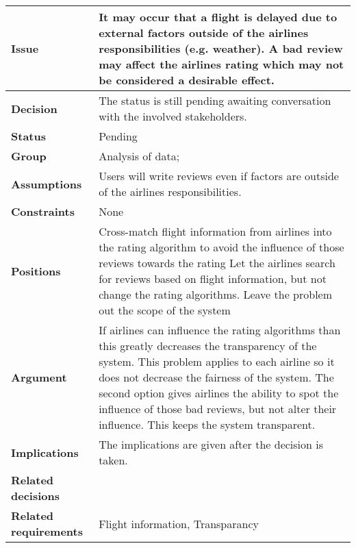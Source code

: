 
\begin{tabular}{ l  p{10cm}}
\hline
\bf Issue & It may occur that a flight is delayed due to external factors outside of the airlines responsibilities (e.g. weather). A bad review may affect the airlines rating which may not be considered a desirable effect.\\
\hline
\bf Decision & The status is still pending awaiting conversation with the involved stakeholders.\\
\hline
\bf Status & Pending\\
\hline
\bf Group & Analysis of data; \\
\hline
\bf Assumptions & Users will write reviews even if factors are outside of the airlines responsibilities.\\
\hline
\bf Constraints & None \\
\hline
\bf Positions & Cross-match flight information from airlines into the rating algorithm to avoid the influence of those reviews towards the rating \newline\newline
Let the airlines search for reviews based on flight information, but not change the rating algorithms. \newline\newline
Leave the problem out the scope of the system 
\\
\hline
\bf Argument & If airlines can influence the rating algorithms than this greatly decreases the transparency of the system. This problem applies to each airline so it does not decrease the fairness of the system. The second option gives airlines the ability to spot the influence of those bad reviews, but not alter their influence. This keeps the system transparent. \\
\hline
\bf Implications &The implications are given after the decision is taken.  \\
\hline
\bf Related decisions & \\
\hline
\bf Related requirements  & Flight information, Transparancy \\
\hline
\end{tabular}
